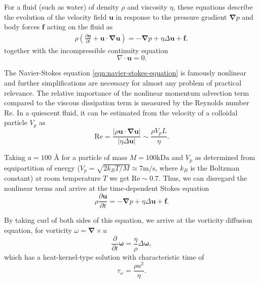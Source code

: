 \documentclass{doctoral}
\newcommand{\pd}{\partial}
\newcommand{\Reynolds}{\mathrm{Re}}
\begin{document}
For a fluid (such as water) of density $\rho$ and viscosity $\eta$, these equations describe the evolution of the velocity field $\bm{u}$ in response to the pressure gradient $\bm{\nabla} p$ and body forces $\bm{f}$ acting on the fluid as
\begin{eqnarray}
    \rho \left( \frac{\pd \bm{u}}{\pd t} + \bm{u} \cdot \bm{\nabla u} \right) = - \bm{\nabla} p + \eta \Delta \bm{u} + \bm{f}, \label{eqn:navier-stokes-equation}
\end{eqnarray}
together with the incompressible continuity equation
\begin{equation}
    \nabla \cdot \bm{u} = 0 \label{eqn:incompressibility}.
\end{equation}

The Navier-Stokes equation \eqref{eqn:navier-stokes-equation} is famously nonlinear and further simplifications are necessary for almost any problem of practical relevance.
The relative importance of the nonlinear momentum advection term compared to the viscous dissipation term is measured by the Reynolds number $\Reynolds$\cite{Reynolds_1883}.
In a quiescent fluid, it can be estimated from the velocity of a colloidal particle $V_p$ as
\begin{equation}
    \Reynolds = \frac{|\rho \bm{u} \cdot \bm{\nabla}\bm{u}|}{|\eta \Delta \bm{u}|} \sim \frac{\rho V_p L}{\eta}.
    \label{eqn:reynolds-based-estimate}
\end{equation}

Taking $a = 100$ \AA{} for a particle of mass $M = 100 \mathrm{k Da}$ and $V_p$ as determined from equipartition of energy ($V_p = \sqrt{2 k_{B} T / M} \approx 7 \mathrm{m/s}$, where $k_B$ is the Boltzman constant) at room temperature $T$ we get $\Reynolds \sim 0.7$.
Thus, we can disregard the nonlinear terms and arrive at the time-dependent Stokes equation
\begin{equation}
    \rho \frac{\pd \bm{u}}{\pd t} = - \bm{\nabla} p + \eta \Delta \bm{u} + \bm{f}.
    \label{eqn:time-dependent-stokes-equation}
\end{equation}

By taking curl of both sides of this equation, we arrive at the vorticity diffusion equation, for vorticity $\omega = \bm{\nabla} \times u$
\begin{equation}
    \frac{\pd}{\pd t} \bm{\omega}  = \frac{\eta}{\rho} \Delta \bm{\omega} , \label{eqn:vorticity-diffusion}
\end{equation}
which has a heat-kernel-type solution with characteristic time of
\begin{equation}
    \tau_\omega = \frac{\rho a^2}{\eta}.
    \label{eqn:vorticity-timescale}
\end{equation}
\end{document}
